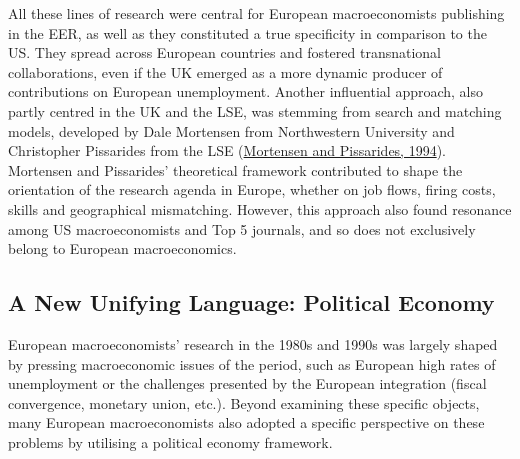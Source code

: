 \documentclass[
  12pt,
  onecolumn]{article}
\begin{document}
All these lines of research were central for European macroeconomists
publishing in the EER, as well as they constituted a true specificity in
comparison to the US. They spread across European countries and fostered
transnational collaborations, even if the UK emerged as a more dynamic
producer of contributions on European unemployment. Another influential
approach, also partly centred in the UK and the LSE, was stemming from
search and matching models, developed by Dale Mortensen from
Northwestern University and Christopher Pissarides from the LSE
(\protect\hyperlink{ref-mortensen1994}{Mortensen and Pissarides, 1994}).
Mortensen and Pissarides' theoretical framework contributed to shape the
orientation of the research agenda in Europe, whether on job flows,
firing costs, skills and geographical mismatching. However, this
approach also found resonance among US macroeconomists and Top 5
journals, and so does not exclusively belong to European macroeconomics.

\hypertarget{political-economics}{%
\subsection{A New Unifying Language: Political
Economy}\label{political-economics}}

European macroeconomists' research in the 1980s and 1990s was largely
shaped by pressing macroeconomic issues of the period, such as European
high rates of unemployment or the challenges presented by the European
integration (fiscal convergence, monetary union, etc.). Beyond examining
these specific objects, many European macroeconomists also adopted a
specific perspective on these problems by utilising a political economy
framework.
\end{document}
